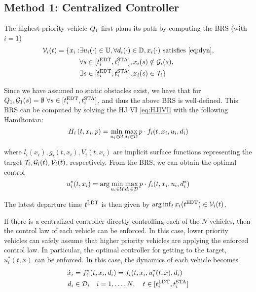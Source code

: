 \subsection{Method 1: Centralized Controller \label{sec:cc}}
The highest-priority vehicle $Q_1$ first plans its path by computing the BRS (with $i=1$)
\vspace{-0.3em}
\begin{equation}
\label{eq:BRS}
\begin{aligned}
\mathcal{V}_i(t) = \{x_i: &\exists u_i(\cdot) \in \mathbb{U}, \forall d_i(\cdot) \in \mathbb{D}, x_i(\cdot) \text{ satisfies \eqref{eq:dyn}}, \\
&\forall s \in [t^\text{EDT}_i, t^\text{STA}_i], x_i(s) \notin \mathcal{G}_i(s), \\
&\exists s \in [t^\text{EDT}_i, t^\text{STA}_i], x_i(s) \in \mathcal{T}_i\}
\end{aligned}
\end{equation}

Since we have assumed no static obstacles exist, we have that for $Q_1, \mathcal{G}_1(s)=\emptyset ~ \forall s \in [t^\text{EDT}_i, t^\text{STA}_i]$, and thus the above BRS is well-defined. This BRS can be computed by solving the HJ VI \eqref{eq:HJIVI} with the following Hamiltonian:
\vspace{-0.3em}
\begin{equation}
H_i\left(t, x_i, p\right) = \min_{u_i \in \mathcal{U}} \max_{d_i \in \mathcal{D}} p \cdot f_i(t, x_i, u_i, d_i)
\end{equation}

\noindent where $l_i(x_i), g_i(t,x_i),V_i(t,x_i)$ are implicit surface functions representing the target $\mathcal{T}_i, \mathcal{G}_i(t), \mathcal{V}_i(t)$, respectively. From the BRS, we can obtain the optimal control
\vspace{-0.3em}
\begin{equation}
\label{eq:opt_ctrl_i}
u_i^*(t,x_i) =  \arg \min_{u_i \in \mathcal{U}} \max_{d_i \in \mathcal{D}} p \cdot f_i(t, x_i, u_i, d^*_i)
\end{equation}

The latest departure time $t^\text{LDT}$ is then given by $\arg \inf_t x_i(t^\text{EDT}) \in \mathcal{V}_i(t)$.

If there is a centralized controller directly controlling each of the $N$ vehicles, then the control law of each vehicle can be enforced. In this case, lower priority vehicles can safely assume that higher priority vehicles are applying the enforced control law. In particular, the optimal controller for getting to the target, $u^*_i(t, x)$ can be enforced. In this case, the dynamics of each vehicle becomes 
\vspace{-0.3em}
\begin{equation}
\label{eq:dyn_cc}
\begin{aligned}
\dot x_i &= f^*_i (t, x_i, d_i) = f_i(t, x_i, u^*_i(t,x), d_i) \\
d_i &\in \mathcal{D}_i \quad i = 1,\ldots, N, \quad t \in [t^\text{LDT}_i, t^\text{STA}_i]
\end{aligned}
\end{equation}

